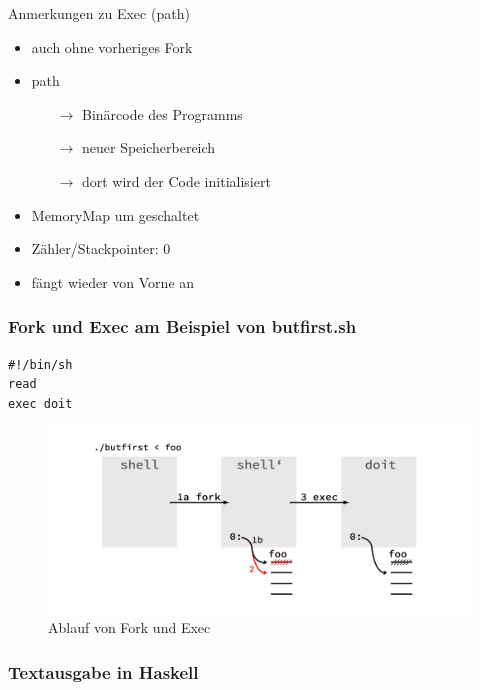 	Anmerkungen zu Exec (path)
		\begin{itemize}
			\item auch ohne vorheriges Fork
			\item path
			\begin{itemize}
				\item[$\rightarrow$] Binärcode des Programms
				\item[$\rightarrow$] neuer Speicherbereich
				\item[$\rightarrow$] dort wird der Code initialisiert
			\end{itemize}
				\item MemoryMap um geschaltet
				\item Zähler/Stackpointer: 0
				\item fängt wieder von Vorne an
		\end{itemize}

	\subsubsection*{Fork und Exec am Beispiel von butfirst.sh} %
	\label{ssub:fork_am_beispiel_von_butfirst_sh}
	
		\lstShell
		\begin{lstlisting}
#!/bin/sh
read
exec doit
		\end{lstlisting}

		\begin{figure}[th]
			\caption{Ablauf von Fork und Exec}
			\includegraphics[width=\textwidth]{workfiles/v2_4}
		\end{figure}




	\subsubsection*{Textausgabe in Haskell} %
	\label{ssub:textausgabe_in_haskell}
	
